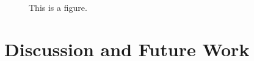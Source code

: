 \documentclass[10pt,letterpaper]{article}
\begin{document}
\begin{figure}[H]
\begin{center}
\end{center}
\caption{This is a figure.} 
\label{seeJudge}
\end{figure}

\section{Discussion and Future Work}


%
%
%
%
\end{document}
